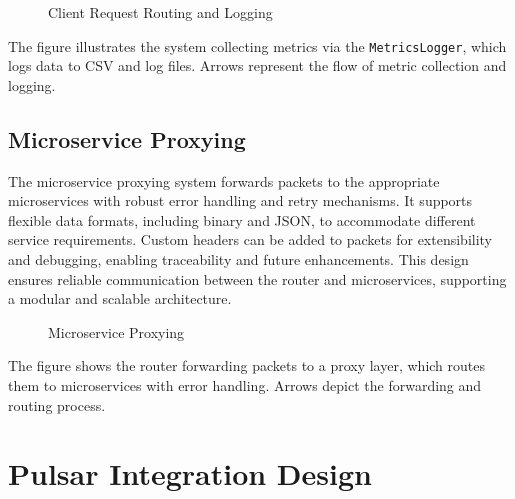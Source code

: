 {\begin{figure}[h]
\caption{Client Request Routing and Logging}
\label{fig:client_logging}
\end{figure}


The figure illustrates the system collecting metrics via the \texttt{MetricsLogger}, which logs data to CSV and log files. Arrows represent the flow of metric collection and logging.

\subsection{Microservice Proxying}

The microservice proxying system forwards packets to the appropriate microservices with robust error handling and retry mechanisms. It supports flexible data formats, including binary and JSON, to accommodate different service requirements. Custom headers can be added to packets for extensibility and debugging, enabling traceability and future enhancements. This design ensures reliable communication between the router and microservices, supporting a modular and scalable architecture.



\begin{figure}[h]
\centering
{}
\caption{Microservice Proxying}
\label{fig:proxying}
\end{figure}

The figure shows the router forwarding packets to a proxy layer, which routes them to microservices with error handling. Arrows depict the forwarding and routing process.



\section{Pulsar Integration Design}

}
